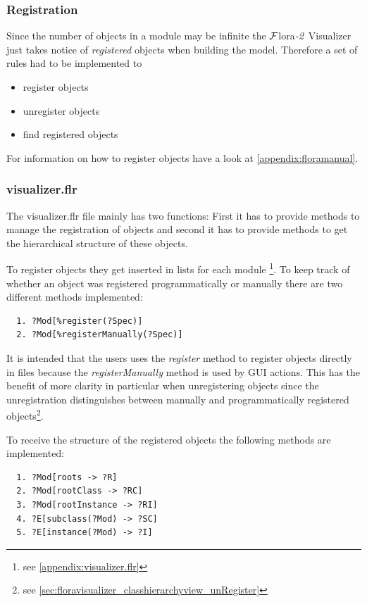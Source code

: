 \documentclass[a4paper,11pt]{article}
\newcommand{\FVIZ}{{\mbox{\sc ${\cal F}${lora}\rm\emph{-2} {Visualizer}}}\xspace}
\begin{document}
\subsubsection{Registration}
Since the number of objects in a module may be infinite the \FVIZ just
takes notice of \emph{registered} objects when building the model.
Therefore a set of rules had to be implemented to
\begin{itemize}
  \item register objects
  \item unregister objects
  \item find registered objects
\end{itemize}

For information on how to register objects have a look at
\ref{appendix:floramanual}.

\subsubsection{visualizer.flr}
\label{sec:floravisualizer_reasoner_visualizer.flr}
The visualizer.flr file mainly has two functions: First it has to provide
methods to manage the registration of objects and second it has
to provide methods to get the hierarchical structure of these objects.

To register objects they get inserted in lists for each module
\footnote{see \ref{appendix:visualizer.flr}}. To keep
track of whether an object was registered programmatically or
manually there are two different methods implemented:
\begin{verbatim}
  1. ?Mod[%register(?Spec)]
  2. ?Mod[%registerManually(?Spec)]
\end{verbatim}
It is intended that the users uses the \emph{register} method
to register objects directly in files because the
\emph{registerManually} method is used by GUI actions. This
has the benefit of more clarity in particular when unregistering
objects since the unregistration distinguishes between manually
and programmatically registered objects\footnote{
see \ref{sec:floravisualizer_classhierarchyview_unRegister}}.

To receive the structure of the registered objects the following
methods are implemented:
\begin{verbatim}
  1. ?Mod[roots -> ?R]
  2. ?Mod[rootClass -> ?RC]
  3. ?Mod[rootInstance -> ?RI]
  4. ?E[subclass(?Mod) -> ?SC]
  5. ?E[instance(?Mod) -> ?I]
\end{verbatim}
\end{document}
